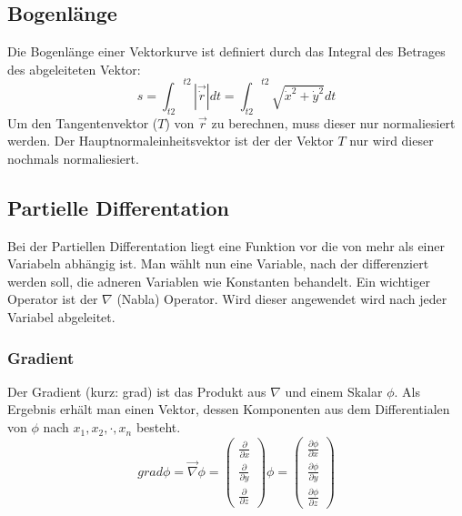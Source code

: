 \documentclass[a4paper,10pt]{scrartcl}
\begin{document}
        \subsection*{Bogenlänge}
        Die Bogenlänge einer Vektorkurve ist definiert durch das Integral des Betrages des abgeleiteten Vektor:
        \begin{equation*}
            s = {\int_{t2}}^{t2} | \vec{\dot{r}} | dt = {\int_{t2}}^{t2}  \sqrt{{\dot{x}^2} +{\dot{y}^2}} dt 
        \end{equation*} 
        Um den Tangentenvektor (\(T\)) von \(\vec{r}\) zu berechnen, muss dieser nur normaliesiert werden. Der Hauptnormaleinheitsvektor ist der der 
        Vektor \(T\) nur wird dieser nochmals normaliesiert.
    \subsection{Partielle Differentation}
        Bei der Partiellen Differentation liegt eine Funktion vor die von mehr als einer Variabeln abhängig ist. Man wählt nun eine Variable, nach der differenziert
        werden soll, die adneren Variablen wie Konstanten behandelt. Ein wichtiger Operator ist der \(\nabla\) (Nabla) Operator. Wird dieser angewendet wird nach jeder 
        Variabel abgeleitet.
        \subsubsection{Gradient}
        Der Gradient (kurz: grad) ist das Produkt aus \(\nabla\) und einem Skalar \(\phi\). Als Ergebnis erhält man einen Vektor, dessen Komponenten aus dem Differentialen 
        von \(\phi\) nach \(x_1, x_2,\cdot,x_n\) besteht. 
        \begin{equation*}
            grad \phi = \vec{\nabla} \phi = \begin{pmatrix} \frac{\partial}{\partial x} \\ \frac{\partial}{\partial y} \\ \frac{\partial}{\partial z} \end{pmatrix} \phi = 
            \begin{pmatrix} \frac{\partial \phi}{\partial x} \\ \frac{\partial \phi}{\partial y} \\ \frac{\partial \phi}{\partial z} \end{pmatrix} 
        \end{equation*}
\end{document}
